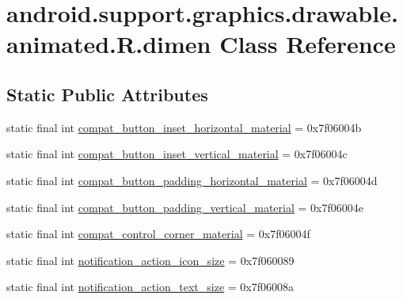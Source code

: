\hypertarget{classandroid_1_1support_1_1graphics_1_1drawable_1_1animated_1_1_r_1_1dimen}{}\section{android.\+support.\+graphics.\+drawable.\+animated.\+R.\+dimen Class Reference}
\label{classandroid_1_1support_1_1graphics_1_1drawable_1_1animated_1_1_r_1_1dimen}
\subsection*{Static Public Attributes}
\begin{DoxyCompactItemize}
\item 
static final int \mbox{\hyperlink{classandroid_1_1support_1_1graphics_1_1drawable_1_1animated_1_1_r_1_1dimen_ae0507725a2fa6747595298ec45712abd}{compat\+\_\+button\+\_\+inset\+\_\+horizontal\+\_\+material}} = 0x7f06004b
\item 
static final int \mbox{\hyperlink{classandroid_1_1support_1_1graphics_1_1drawable_1_1animated_1_1_r_1_1dimen_a6a82ebce1ae0d9c4c2006c8cf3f41b27}{compat\+\_\+button\+\_\+inset\+\_\+vertical\+\_\+material}} = 0x7f06004c
\item 
static final int \mbox{\hyperlink{classandroid_1_1support_1_1graphics_1_1drawable_1_1animated_1_1_r_1_1dimen_a560835b69a502308d2260c9a55eb3d32}{compat\+\_\+button\+\_\+padding\+\_\+horizontal\+\_\+material}} = 0x7f06004d
\item 
static final int \mbox{\hyperlink{classandroid_1_1support_1_1graphics_1_1drawable_1_1animated_1_1_r_1_1dimen_a5f6d5ea0b964fb256ee9c2ce0faf95ee}{compat\+\_\+button\+\_\+padding\+\_\+vertical\+\_\+material}} = 0x7f06004e
\item 
static final int \mbox{\hyperlink{classandroid_1_1support_1_1graphics_1_1drawable_1_1animated_1_1_r_1_1dimen_a84be4e4e24b1bdf17eddfd88e078615f}{compat\+\_\+control\+\_\+corner\+\_\+material}} = 0x7f06004f
\item 
static final int \mbox{\hyperlink{classandroid_1_1support_1_1graphics_1_1drawable_1_1animated_1_1_r_1_1dimen_a0ae163d5f1a8a26eaa9c0ee9f4353bda}{notification\+\_\+action\+\_\+icon\+\_\+size}} = 0x7f060089
\item 
static final int \mbox{\hyperlink{classandroid_1_1support_1_1graphics_1_1drawable_1_1animated_1_1_r_1_1dimen_aa04d155db47f128bff62166ec70a1ac1}{notification\+\_\+action\+\_\+text\+\_\+size}} = 0x7f06008a

\end{DoxyCompactItemize}

